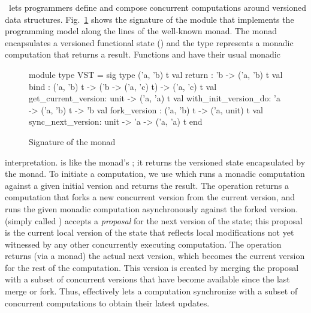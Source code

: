 \name\ lets programmers define and compose concurrent computations
around versioned data structures.  Fig.~\ref{fig:dali-monad} shows the
signature of the \nameMonad module that implements the programming
model along the lines of the well-known  monad. The monad
encapsulates a versioned functional state () and the type
 represents a monadic computation that returns a 
result.  Functions  and  have their usual monadic
\begin{figure}
\begin{center}
  \begin{ocaml}
  module type VST = sig
    type ('a, 'b) t
    val return : 'b -> ('a, 'b) t
    val bind : ('a, 'b) t -> ('b -> ('a, 'c) t) -> ('a, 'c) t
    val get_current_version: unit -> ('a, 'a) t
    val with_init_version_do: 'a -> ('a, 'b) t -> 'b
    val fork_version : ('a, 'b) t -> ('a, unit) t
    val sync_next_version: unit -> 'a -> ('a, 'a) t
  end
  \end{ocaml}
  \caption{Signature of the \name monad}
  \label{fig:dali-monad}
\end{center}
\end{figure}
interpretation.  is like the 
monad's ; it returns the versioned state encapsulated by the
monad. To initiate a computation, we use 
which runs a monadic computation against a given initial version and
returns the result. The  operation returns a
computation that forks a new concurrent version from the current
version, and runs the given monadic computation asynchronously against
the forked version.   (simply called )
accepts a \emph{proposal} for the next version of the state; this
proposal is the current local version of the state that reflects local
modifications not yet witnessed by any other concurrently executing
computation.  The operation returns (via a monad) the actual next
version, which becomes the current version for the rest of the
computation.  This version is created by merging the proposal with a
subset of concurrent versions that have become available since the
last merge or fork. Thus,  effectively lets a computation
synchronize with a subset of concurrent computations to obtain their
latest updates.

